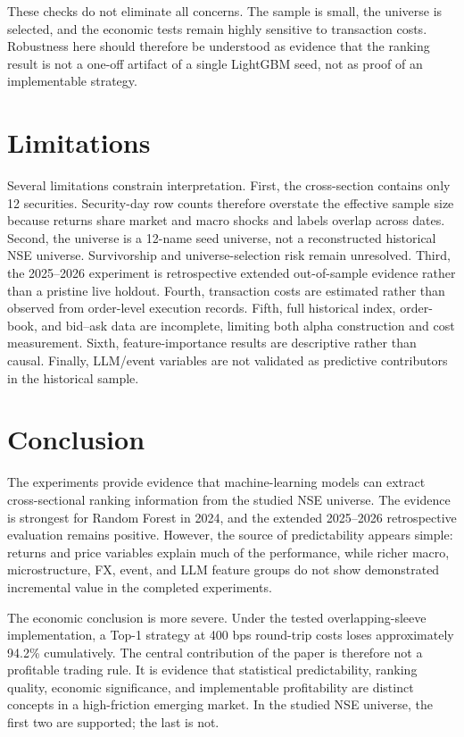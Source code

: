 \documentclass[11pt,a4paper]{article}
\begin{document}
These checks do not eliminate all concerns.  The sample is small, the universe
is selected, and the economic tests remain highly sensitive to transaction
costs.  Robustness here should therefore be understood as evidence that the
ranking result is not a one-off artifact of a single LightGBM seed, not as
proof of an implementable strategy.

\section{Limitations}
\label{sec:limitations}

Several limitations constrain interpretation.  First, the cross-section
contains only 12 securities.  Security-day row counts therefore overstate the
effective sample size because returns share market and macro shocks and
labels overlap across dates.  Second, the universe is a 12-name seed universe,
not a reconstructed historical NSE universe.  Survivorship and
universe-selection risk remain unresolved.  Third, the 2025--2026 experiment
is retrospective extended out-of-sample evidence rather than a pristine live
holdout.  Fourth, transaction costs are estimated rather than observed from
order-level execution records.  Fifth, full historical index, order-book, and
bid--ask data are incomplete, limiting both alpha construction and cost
measurement.  Sixth, feature-importance results are descriptive rather than
causal.  Finally, LLM/event variables are not validated as predictive
contributors in the historical sample.

\section{Conclusion}
\label{sec:conclusion}

The experiments provide evidence that machine-learning models can extract
cross-sectional ranking information from the studied NSE universe.  The
evidence is strongest for Random Forest in 2024, and the extended 2025--2026
retrospective evaluation remains positive.  However, the source of
predictability appears simple: returns and price variables explain much of the
performance, while richer macro, microstructure, FX, event, and LLM feature
groups do not show demonstrated incremental value in the completed
experiments.

The economic conclusion is more severe.  Under the tested overlapping-sleeve
implementation, a Top-1 strategy at 400 bps round-trip costs loses
approximately 94.2\% cumulatively.  The central contribution of the paper is
therefore not a profitable trading rule.  It is evidence that statistical
predictability, ranking quality, economic significance, and implementable
profitability are distinct concepts in a high-friction emerging market.  In
the studied NSE universe, the first two are supported; the last is not.
\end{document}
